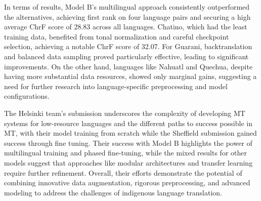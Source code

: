 In terms of results, Model B’s multilingual approach consistently outperformed the alternatives, achieving first rank on four language pairs and securing a high average ChrF score of 28.83 across all languages. Chatino, which had the least training data, benefited from tonal normalization and careful checkpoint selection, achieving a notable ChrF score of 32.07. For Guarani, backtranslation and balanced data sampling proved particularly effective, leading to significant improvements. On the other hand, languages like Nahuatl and Quechua, despite having more substantial data resources, showed only marginal gains, suggesting a need for further research into language-specific preprocessing and model configurations.

The Helsinki team’s submission underscores the complexity of developing MT systems for low-resource languages and the different paths to success possible in MT, with their model training from scratch while the Sheffield submission gained success through fine tuning. Their success with Model B highlights the power of multilingual training and phased fine-tuning, while the mixed results for other models suggest that approaches like modular architectures and transfer learning require further refinement. Overall, their efforts demonstrate the potential of combining innovative data augmentation, rigorous preprocessing, and advanced modeling to address the challenges of indigenous language translation.

